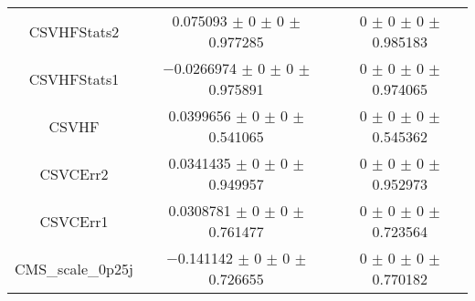 \begin{table}
\begin{tabular}{ccc}
CSVHFStats2 	& \num{0.075093} $\pm$ \num{0} $\pm$ \num{0} $\pm$ \num{0.977285} 	& \num{0} $\pm$ \num{0} $\pm$ \num{0} $\pm$ \num{0.985183}\\
CSVHFStats1 	& \num{-0.0266974} $\pm$ \num{0} $\pm$ \num{0} $\pm$ \num{0.975891} 	& \num{0} $\pm$ \num{0} $\pm$ \num{0} $\pm$ \num{0.974065}\\
CSVHF 	& \num{0.0399656} $\pm$ \num{0} $\pm$ \num{0} $\pm$ \num{0.541065} 	& \num{0} $\pm$ \num{0} $\pm$ \num{0} $\pm$ \num{0.545362}\\
CSVCErr2 	& \num{0.0341435} $\pm$ \num{0} $\pm$ \num{0} $\pm$ \num{0.949957} 	& \num{0} $\pm$ \num{0} $\pm$ \num{0} $\pm$ \num{0.952973}\\
CSVCErr1 	& \num{0.0308781} $\pm$ \num{0} $\pm$ \num{0} $\pm$ \num{0.761477} 	& \num{0} $\pm$ \num{0} $\pm$ \num{0} $\pm$ \num{0.723564}\\
CMS\_scale\_0p25j 	& \num{-0.141142} $\pm$ \num{0} $\pm$ \num{0} $\pm$ \num{0.726655} 	& \num{0} $\pm$ \num{0} $\pm$ \num{0} $\pm$ \num{0.770182}\\
\bottomrule
\end{tabular}
\end{table}